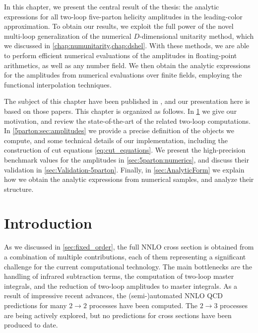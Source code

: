 In this chapter, we present the central result of the thesis:
the analytic expressions for all two-loop five-parton helicity amplitudes in the leading-color approximation.
To obtain our results, we exploit the full power of the novel multi-loop generalization of the numerical $D$-dimensional unitarity method,
which we discussed in \cref{chap:numunitarity,chap:dshel}.
With these methods, we are able to perform efficient numerical evaluations of the amplitudes in floating-point arithmetics, as well as any number field.
We then obtain the analytic expressions for the amplitudes from numerical evaluations over finite fields,
employing the functional interpolation techniques.

The subject of this chapter have been published in \cite{Abreu:2018jgq,Abreu:2019odu},
and our presentation here is based on those papers.
This chapter is organized as follows.
In \cref{5parton:sec:intro} we give our motivation, and review the state-of-the-art of the related two-loop computations.
In \cref{5parton:sec:amplitudes} we provide a precise definition  of the objects we compute,
and some technical details of our implementation, including the construction of cut equations \eqref{eq:cut_equations}.
We present the high-precision benchmark values for the amplitudes in \cref{sec:5parton:numerics},
and discuss their validation in \cref{sec:Validation-5parton}.
Finally, in \cref{sec:AnalyticForm} we explain how we obtain the analytic expressions from numerical samples,
and analyze their structure.

\section{Introduction}
\label{5parton:sec:intro}

As we discussed in \cref{sec:fixed_order}, the full NNLO cross section 
is obtained from a combination of multiple contributions, each of them
representing a significant challenge for the current computational technology.
The main bottlenecks are
the handling of infrared subtraction terms,
the computation of two-loop master integrals, 
and the reduction of two-loop amplitudes to master integrals.
As a result of impressive recent advances, the (semi-)automated NNLO QCD predictions for
many $2\to2$ processes have been computed.
The $2\to3$ processes are being actively explored, but no predictions for cross sections have been produced to date.

